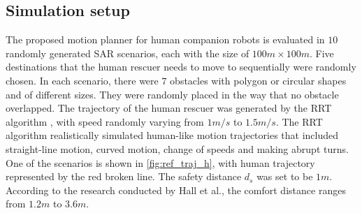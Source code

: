 \documentclass[journal]{IEEEtran}
\newcommand{\todonote}[1]{\vspace{0px} %
	\todo[inline, color=green!30]{\textbf{[Note:]} {#1}} %
}
\DeclareRobustCommand{\clnote}[1]{\ifthenelse{\boolean{include-notes}}%
{\textcolor{orange}{\textbf{CL: #1}}}{}}
\DeclareRobustCommand{\dhnote}[1]{\ifthenelse{\boolean{include-notes}}%
{\textcolor{blue}{\textbf{DH: #1}}}{}}
\begin{document}
	\subsection{Simulation setup}
The proposed motion planner for human companion robots is evaluated in $10$ randomly generated SAR scenarios, each with the size of $100 m\times 100 m$.
    Five destinations that the human rescuer needs to move to sequentially were randomly chosen.
	In each scenario, there were $7$ obstacles with polygon or circular shapes and of different sizes. They were randomly placed in the way that no obstacle overlapped.
      The trajectory of the human rescuer was generated by the RRT algorithm \cite{kuffner2000rrt}, with speed randomly varying from $1m/s$ to $1.5m/s$.
      The RRT algorithm realistically simulated human-like motion trajectories that included straight-line motion, curved motion, change of speeds and making abrupt turns.
    One of the scenarios is shown in \cref{fig:ref_traj_h}, with human trajectory represented by the red broken line.
	The safety distance $d_s$ was set to be $1m$.
	According to the research conducted by Hall et al.\cite{hall1968proxemics}, the comfort distance ranges from $1.2m$ to $3.6m$.
\end{document}
